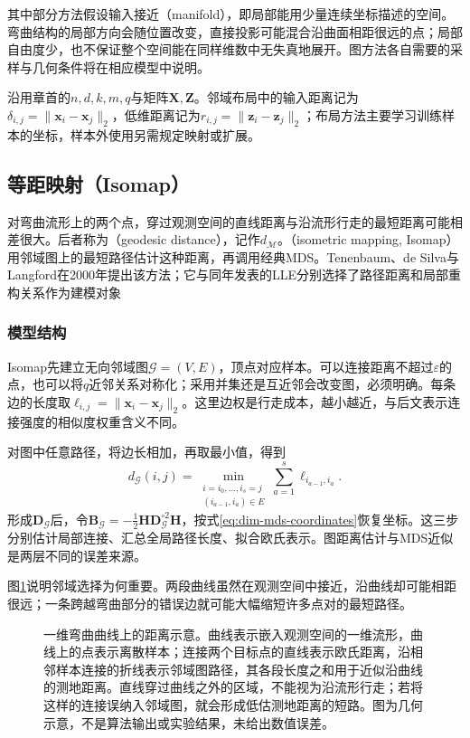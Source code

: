 其中部分方法假设输入接近（manifold），即局部能用少量连续坐标描述的空间。弯曲结构的局部方向会随位置改变，直接投影可能混合沿曲面相距很远的点；局部自由度少，也不保证整个空间能在同样维数中无失真地展开。图方法各自需要的采样与几何条件将在相应模型中说明。

沿用章首的$n,d,k,m,q$与矩阵$\bm{X},\bm{Z}$。邻域布局中的输入距离记为$\delta_{i,j}=\lVert\bm{x}_i-\bm{x}_j\rVert_2$，低维距离记为$r_{i,j}=\lVert\bm{z}_i-\bm{z}_j\rVert_2$；布局方法主要学习训练样本的坐标，样本外使用另需规定映射或扩展。

\subsection{等距映射（Isomap）}
\label{sec:dim-isomap}

对弯曲流形上的两个点，穿过观测空间的直线距离与沿流形行走的最短距离可能相差很大。后者称为（geodesic distance），记作$d_{\mathcal{M}}$。（isometric mapping, Isomap）用邻域图上的最短路径估计这种距离，再调用经典MDS。Tenenbaum、de Silva与Langford在2000年提出该方法；它与同年发表的LLE分别选择了路径距离和局部重构关系作为建模对象

\subsubsection{模型结构}

Isomap先建立无向邻域图$\mathcal{G}=(V,E)$，顶点对应样本。可以连接距离不超过$\varepsilon$的点，也可以将$q$近邻关系对称化；采用并集还是互近邻会改变图，必须明确。每条边的长度取$\ell_{i,j}=\lVert\bm{x}_i-\bm{x}_j\rVert_2$。这里边权是行走成本，越小越近，与后文表示连接强度的相似度权重含义不同。

对图中任意路径，将边长相加，再取最小值，得到
\begin{equation}
  \label{eq:dim-isomap-distance}
  d_{\mathcal{G}}(i,j)
  =\min_{\substack{i=i_0,\ldots,i_s=j\\(i_{a-1},i_a)\in E}}
    \sum_{a=1}^{s}\ell_{i_{a-1},i_a}.
\end{equation}
形成$\bm{D}_{\mathcal{G}}$后，令$\bm{B}_{\mathcal{G}}=-\tfrac12\bm{H}\bm{D}_{\mathcal{G}}^{\circ2}\bm{H}$，按式\eqref{eq:dim-mds-coordinates}恢复坐标。这三步分别估计局部连接、汇总全局路径长度、拟合欧氏表示。图距离估计与MDS近似是两层不同的误差来源。

图\ref{fig:dim-geodesic}说明邻域选择为何重要。两段曲线虽然在观测空间中接近，沿曲线却可能相距很远；一条跨越弯曲部分的错误边就可能大幅缩短许多点对的最短路径。
\begin{figure}[htbp]
  \centering
  
  \caption{一维弯曲曲线上的距离示意。曲线表示嵌入观测空间的一维流形，曲线上的点表示离散样本；连接两个目标点的直线表示欧氏距离，沿相邻样本连接的折线表示邻域图路径，其各段长度之和用于近似沿曲线的测地距离。直线穿过曲线之外的区域，不能视为沿流形行走；若将这样的连接误纳入邻域图，就会形成低估测地距离的短路。图为几何示意，不是算法输出或实验结果，未给出数值误差。}
  \label{fig:dim-geodesic}
\end{figure}

